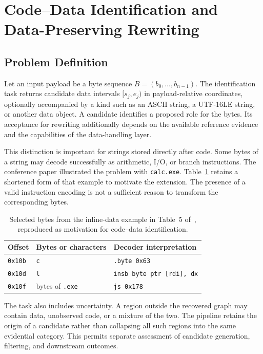 \section{Code--Data Identification and Data-Preserving Rewriting}
\label{sec:code_data}
\subsection{Problem Definition}
Let an input payload be a byte sequence $B=(b_0,\ldots,b_{n-1})$.
The identification task returns candidate data intervals
$[s_j,e_j)$ in payload-relative coordinates, optionally accompanied by
a kind such as an ASCII string, a UTF-16LE string, or another data object.
A candidate identifies a proposed role for the bytes. Its acceptance
for rewriting additionally depends on the available reference evidence
and the capabilities of the data-handling layer.

This distinction is important for strings stored directly after code.
Some bytes of a string may decode successfully as arithmetic, I/O, or
branch instructions. The conference paper illustrated the problem with
\texttt{calc.exe}. Table~\ref{tab:inline_example} retains a shortened
form of that example to motivate the extension. The presence of a valid
instruction encoding is not a sufficient reason to transform the
corresponding bytes.

\begin{table}[t]
\caption{Selected bytes from the inline-data example in Table~5
of~\cite{zone_secrypt_2026}, reproduced as motivation for code--data
identification.}
\label{tab:inline_example}
\centering\small
\begin{tabular}{@{}lll@{}}
\toprule
Offset & Bytes or characters & Decoder interpretation \\
\midrule
\texttt{0x10b} & \texttt{c} & \texttt{.byte 0x63} \\
\texttt{0x10d} & \texttt{l} & \texttt{insb byte ptr [rdi], dx} \\
\texttt{0x10f} & bytes of \texttt{.exe} & \texttt{js 0x178} \\
\bottomrule
\end{tabular}
\end{table}

The task also includes uncertainty. A region outside the recovered graph
may contain data, unobserved code, or a mixture of the two. The pipeline
retains the origin of a candidate rather than collapsing all such
regions into the same evidential category. This permits separate
assessment of candidate generation, filtering, and downstream outcomes.

